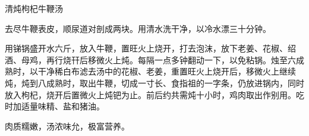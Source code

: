 \begin{recipe}{清炖枸杞牛鞭汤}

\ingredients




\cooking

去尽牛鞭表皮，顺尿道对剖成两块。用清水洗干净，以冷水漂三十分钟。

用锑锅盛开水六斤，放入牛鞭，置旺火上烧开，打去泡沫，放下老姜、花椒、绍酒、母鸡，再行烧幵后移微火上炖。每隔一点多钟翻动一下，以免粘锅。烛至六成熟时，以干净稀白布滤去汤中的花椒、老姜，重置旺火上烧开后，移微火上继续炖，炖到八成熟时，取出牛鞭，切成一寸长、食指祖的一字条，仍放进锅内，同时放入枸杞，烧开后置微火上炖钯为止。前后约共需炖十小时，鸡肉取出作别用。吃时加适量味精、盐和猪油。

\notes

肉质糯嫩，汤浓味允，极富营养。

\end{recipe}

